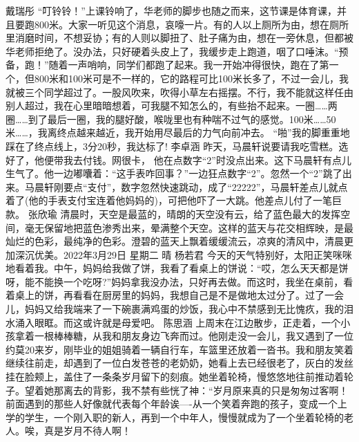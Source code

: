 {}\markdownRendererInterblockSeparator
{}戴瑞彤\markdownRendererInterblockSeparator
{}“叮铃铃！”上课铃响了，华老师的脚步也随之而来，这节课是体育课，并且要跑800米。大家一听见这个消息，哀嚎一片。有的人以上厕所为由，想在厕所里消磨时间，不想妥协；有的人则以脚扭了、肚子痛为由，想在一旁休息，但都被华老师拒绝了。没办法，只好硬着头皮上了，我缓步走上跑道，咽了口唾沫。“预备，跑！”随着一声哨响，同学们都跑了起来。我一开始冲得很快，跑在了第一个，但800米和100米可是不一样的，它的路程可比100米长多了，不过一会儿，我就被三个同学超过了。一股风吹来，吹得小草左右摇摆。不行，我不能就这样任由别人超过，我在心里暗暗想着，可我腿不知怎么的，有些抬不起来。一圈……两圈……到了最后一圈，我的腿好酸，喉咙里也有种喘不过气的感觉。100米……50米……，我离终点越来越近，我开始用尽最后的力气向前冲去。\markdownRendererInterblockSeparator
{}“啪”我的脚重重地踩在了终点线上，3分20秒，我达标了!\markdownRendererInterblockSeparator
{}\markdownRendererInterblockSeparator
{}李卓涵\markdownRendererInterblockSeparator
{}昨天，马晨轩说要请我吃雪糕。选好了，他便带我去付钱。网很卡， 他在点数字“2”时没点出来。这下马晨轩有点儿生气了。他一边嘟囔着：“这手表咋回事？”一边狂点数字“2”。忽然一个“2”跳了出来。马晨轩刚要点“支付”，数字忽然快速跳动，成了“22222”，马晨轩差点儿就点着了(他的手表支付宝连着他妈妈的)，可把他吓了一大跳。他差点儿付了一笔巨款。\markdownRendererInterblockSeparator
{}\markdownRendererInterblockSeparator
{}张欣瑜\markdownRendererInterblockSeparator
{}清晨时，天空是最蓝的，晴朗的天空没有云，给了蓝色最大的发挥空间，毫无保留地把蓝色渗秀出来，晕满整个天空。这样的蓝天与花交相辉映，是最灿烂的色彩，最纯净的色彩。澄碧的蓝天上飘着缓缓流云，凉爽的清风中，清晨更加深沉优美。2022年3月29日 星期二 晴\markdownRendererInterblockSeparator
{}\markdownRendererInterblockSeparator
{}杨若君\markdownRendererInterblockSeparator
{}今天的天气特别好，太阳正笑咪咪地看着我。中午，妈妈给我做了饼，我看了看桌上的饼说：“哎，怎么天天都是饼呀，能不能换一个吃呀?”妈妈拿我没办法，只好再去做。而这时，我坐在桌前，看着桌上的饼，再看看在厨房里的妈妈，我想自己是不是做地太过分了。过了一会儿，妈妈又给我端来了一下碗裹满鸡蛋的炒饭，我心中不禁感到无比愧疚，我的泪水涌入眼眶。而这或许就是母爱吧。\markdownRendererInterblockSeparator
{}\markdownRendererInterblockSeparator
{}陈思涵\markdownRendererInterblockSeparator
{}上周末在江边散步，正走着，一个小孩拿着一根棒棒糖，从我和朋友身边飞奔而过。他刚走没一会儿，我又遇到了一位约莫20来岁，刚毕业的姐姐骑着一辆自行车，车篮里还放着一沓书。我和朋友笑着继续往前走，却遇到了一位白发苍苍的老奶奶，她看上去已经很老了，灰白的发丝挂在脸颊上，盖住了一条条岁月留下的刻痕。她坐着轮椅，慢悠悠地往前推动着轮子。望着她那离去的背影，我不禁有些恍了神：“岁月原来真的只是匆匆过客啊！前面遇到的那些人好像就代表每个年龄诶----从一个笑着奔跑的孩子，变成一个上学的学生，一个刚入职的新人，再到一个中年人，慢慢就成为了一个坐着轮椅的老人。唉，真是岁月不待人啊！\markdownRendererInterblockSeparator

